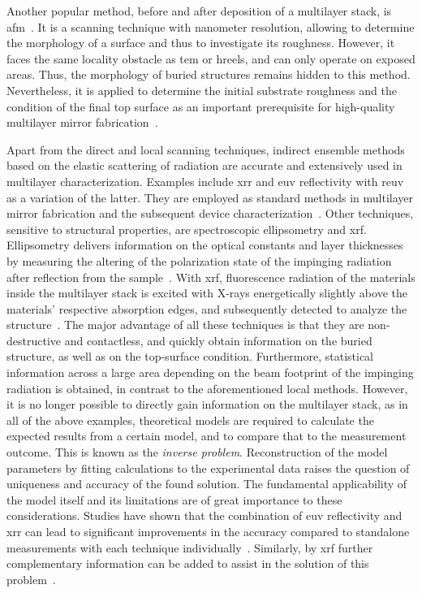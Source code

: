 Another popular method, before and after deposition of a multilayer stack, is
\gls{afm}~\cite{binnig_atomic_1986}.
It is a scanning technique with nanometer resolution, allowing to determine the
morphology of a surface and thus to investigate its roughness.
However, it faces the same locality obstacle as \gls{tem} or \gls{hreels}, and
can only operate on exposed areas.
Thus, the morphology of buried structures remains hidden to this method.
Nevertheless, it is applied to determine the initial substrate roughness and the
condition of the final top surface as an important prerequisite for high-quality
multilayer mirror fabrication~\cite{louis_progress_2000,
bajt_investigation_2001}.

Apart from the direct and local scanning techniques, indirect ensemble methods
based on the elastic scattering of radiation are accurate and extensively used
in multilayer characterization.
Examples include \gls{xrr} and \gls{euv} reflectivity with \gls{reuv} as a
variation of the latter.
They are employed as standard methods in multilayer mirror fabrication and the
subsequent device characterization~\cite{lim_fabrication_2001,
bajt_investigation_2001, braun_mo/si_2002,scholze_high-accuracy_2003}.
Other techniques, sensitive to structural properties, are spectroscopic
ellipsometry and \Gls{xrf}.
Ellipsometry delivers information on the optical constants and layer thicknesses
by measuring the altering of the polarization state of the impinging radiation
after reflection from the sample~\cite{arwin_unambiguous_1984,
liu_thickness_1999}.
With \gls{xrf}, fluorescence radiation of the materials inside the multilayer
stack is excited with X-rays energetically slightly above the materials'
respective absorption edges, and subsequently detected to analyze the
structure~\cite{kortright_standing_1987, kawamura_interface_1994}.
The major advantage of all these techniques is that they are non-destructive and
contactless, and quickly obtain information on the buried structure, as well as
on the top-surface condition.
Furthermore, statistical information across a large area depending on the beam
footprint of the impinging radiation is obtained, in contrast to the
aforementioned local methods.
However, it is no longer possible to directly gain information on the multilayer
stack, as in all of the above examples, theoretical models are required to
calculate the expected results from a certain model, and to compare that to the
measurement outcome.
This is known as the \emph{inverse problem}.
Reconstruction of the model parameters by fitting calculations to the
experimental data raises the question of uniqueness and accuracy of the found
solution.
The fundamental applicability of the model itself and its limitations are of
great importance to these considerations.
Studies have shown that the combination of \gls{euv} reflectivity and
\gls{xrr} can lead to significant improvements in the accuracy compared to
standalone measurements with each technique
individually~\cite{yakunin_combined_2014}.
Similarly, by \Gls{xrf} further complementary information can be added to assist
in the solution of this problem~\cite{ghose_X-ray_2001}.

